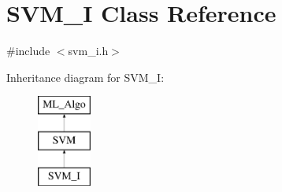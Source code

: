 \hypertarget{classSVM__I}{}\section{S\+V\+M\+\_\+I Class Reference}
\label{classSVM__I}


{\ttfamily \#include $<$svm\+\_\+i.\+h$>$}

Inheritance diagram for S\+V\+M\+\_\+I\+:\begin{figure}[H]
\begin{center}
\leavevmode
\includegraphics[height=3.000000cm]{classSVM__I}
\end{center}
\end{figure}
